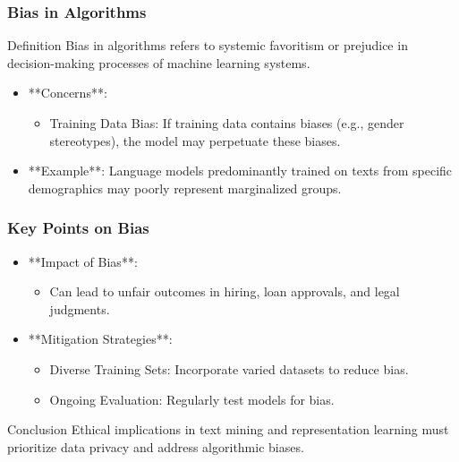 \documentclass[aspectratio=169]{beamer}
\begin{document}
\begin{frame}[fragile]
    \frametitle{Bias in Algorithms}
    \begin{block}{Definition}
        Bias in algorithms refers to systemic favoritism or prejudice in decision-making processes of machine learning systems.
    \end{block}
    \begin{itemize}
        \item **Concerns**:
            \begin{itemize}
                \item Training Data Bias: If training data contains biases (e.g., gender stereotypes), the model may perpetuate these biases.
            \end{itemize}
        \item **Example**: Language models predominantly trained on texts from specific demographics may poorly represent marginalized groups.
    \end{itemize}
\end{frame}

\begin{frame}[fragile]
    \frametitle{Key Points on Bias}
    \begin{itemize}
        \item **Impact of Bias**: 
            \begin{itemize}
                \item Can lead to unfair outcomes in hiring, loan approvals, and legal judgments.
            \end{itemize}
        \item **Mitigation Strategies**: 
            \begin{itemize}
                \item Diverse Training Sets: Incorporate varied datasets to reduce bias.
                \item Ongoing Evaluation: Regularly test models for bias.
            \end{itemize}
    \end{itemize}
    \begin{block}{Conclusion}
        Ethical implications in text mining and representation learning must prioritize data privacy and address algorithmic biases.
    \end{block}
\end{frame}
\end{document}
